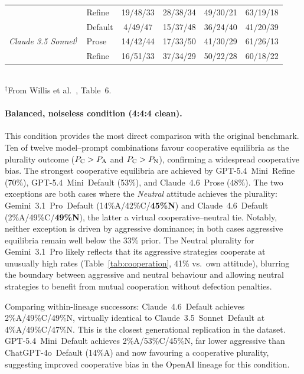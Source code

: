 \begin{table}[t]
\begin{tabular}{@{}llcccc@{}}
  & Refine  & 19/48/33 & 28/38/34 & 49/30/21 & 63/19/18 \\
\multirow{3}{*}{\textit{Claude 3.5 Sonnet}$^\dagger$}
  & Default & 4/49/47  & 15/37/48 & 36/24/40 & 41/20/39 \\
  & Prose   & 14/42/44 & 17/33/50 & 41/30/29 & 61/26/13 \\
  & Refine  & 16/51/33 & 37/34/29 & 50/22/28 & 60/18/22 \\
\bottomrule
\end{tabular}
\vspace{2pt}\\
\small$^\dagger$From Willis et al.\ \cite{Willis2025_llm_ipd}, Table~6.
\end{table}

\paragraph{Balanced, noiseless condition (4:4:4 clean).}
This condition provides the most direct comparison with the original benchmark.
Ten of twelve model--prompt combinations favour cooperative equilibria as
the plurality outcome ($P_{\mathrm{C}} > P_{\mathrm{A}}$ and $P_{\mathrm{C}} > P_{\mathrm{N}}$), confirming a widespread
cooperative bias. The strongest cooperative equilibria are achieved
by GPT-5.4~Mini~Refine (70\%), GPT-5.4~Mini~Default (53\%), and
Claude~4.6~Prose (48\%).
The two exceptions are both cases where the \emph{Neutral} attitude achieves the
plurality: Gemini~3.1~Pro~Default (14\%A/42\%C/\textbf{45\%N}) and
Claude~4.6~Default (2\%A/49\%C/\textbf{49\%N}), the latter a virtual
cooperative--neutral tie. Notably, neither exception is driven by
aggressive dominance; in both cases aggressive equilibria remain well below
the 33\% prior. The Neutral plurality for Gemini~3.1~Pro likely reflects that its
aggressive strategies cooperate at unusually high rates (Table~\ref{tab:cooperation},
41\% vs.\ own attitude), blurring the boundary between aggressive and neutral
behaviour and allowing neutral strategies to benefit from mutual cooperation without
defection penalties.

Comparing within-lineage successors:
Claude~4.6~Default achieves 2\%A/49\%C/49\%N, virtually identical to
Claude~3.5~Sonnet~Default at 4\%A/49\%C/47\%N. This is the closest
generational replication in the dataset.
GPT-5.4~Mini~Default achieves 2\%A/53\%C/45\%N, far lower aggressive than
ChatGPT-4o~Default (14\%A) and now favouring a cooperative plurality, suggesting
improved cooperative bias in the OpenAI lineage for this condition.

